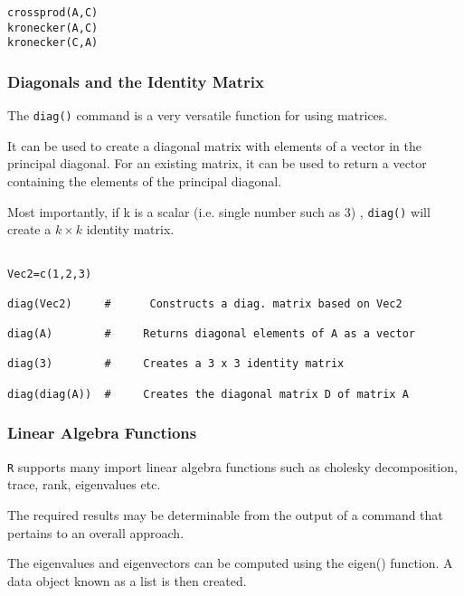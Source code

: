 \documentclass[a4paper,12pt]{article}
\begin{document}
\begin{framed}
\begin{verbatim}
crossprod(A,C)
kronecker(A,C)
kronecker(C,A)
\end{verbatim}
\end{framed}

\subsubsection{Diagonals and the Identity Matrix}

The \texttt{diag()} command is a very versatile function for using matrices.

It can be used to create a diagonal matrix with elements of a vector in the 
principal diagonal. For an existing matrix, it can be used to return a vector 
containing the elements of the principal diagonal.

Most importantly, if k is a scalar (i.e. single number such as 3) , 
\texttt{diag()} will create a $k \times k$ identity matrix.

\begin{framed}
\begin{verbatim}

Vec2=c(1,2,3)

diag(Vec2)     #      Constructs a diag. matrix based on Vec2

diag(A)        #     Returns diagonal elements of A as a vector

diag(3)        #     Creates a 3 x 3 identity matrix

diag(diag(A))  #     Creates the diagonal matrix D of matrix A
\end{verbatim}
\end{framed}
\subsubsection{Linear Algebra Functions}

\texttt{R} supports many import linear algebra functions such as cholesky 
decomposition, trace, rank, eigenvalues etc.

The required results may be determinable from the output of a command that 
pertains to an overall approach.

The eigenvalues and eigenvectors can be computed using the eigen() function.  
A data object known as a list is then created.
\end{document}
